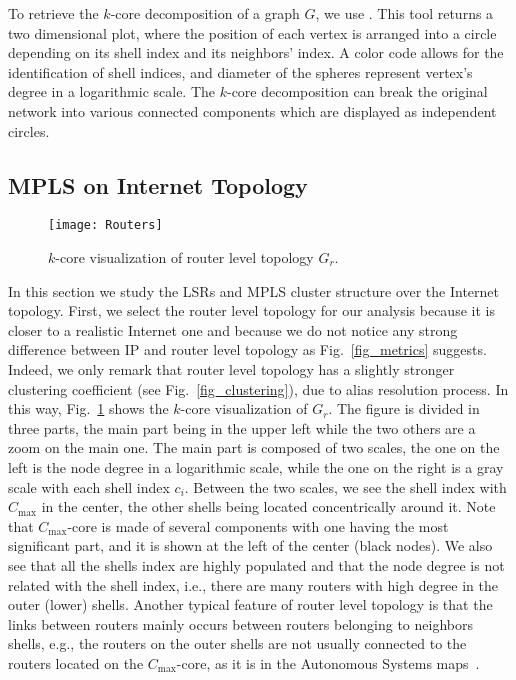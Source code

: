 To retrieve the $k$-core decomposition of a graph $G$, we use
\lanet\cite{Alvarez06k}. This tool returns a two dimensional plot, where the
position of each vertex is arranged into a circle depending on its shell index
and its neighbors' index. A color code allows for the identification of shell
indices, and diameter of the spheres represent vertex's degree in a logarithmic
scale. The $k$-core decomposition can break the original network into various
connected components which are displayed as independent circles.

\subsection{MPLS on Internet Topology}\label{cluster.topo}
\begin{figure}[!t]
  \begin{center}
    \texttt{[image: Routers]}
  \end{center}
\vspace{-0.5cm}
  \caption{$k$-core visualization of router level topology $G_{r}$.}
  \label{fig_k_core_routers}
\end{figure}

In this section we study the LSRs and MPLS cluster structure over the Internet
topology.  First, we select the router level topology for our analysis because
it is closer to a realistic Internet one and because we do not notice any strong
difference between IP and router level topology as Fig.~\ref{fig_metrics}
suggests. Indeed, we only remark that router level topology has a slightly
stronger clustering coefficient (see Fig.~\ref{fig_clustering}), due to alias
resolution process. In this way, Fig.~\ref{fig_k_core_routers} shows the
$k$-core visualization of $G_{r}$.  The figure is divided in three parts, the
main part being in the upper left while the two others are a zoom on the main
one.  The main part is composed of two scales, the one on the left is the node
degree in a logarithmic scale, while the one on the right is a gray scale with
each shell index $c_i$. Between the two scales, we see the shell index with
$C_{\max}$ in the center, the other shells being located concentrically around
it. Note that $C_{\max}$-core is made of several components with one having the
most significant part, and it is shown at the left of the center (black nodes).
We also see that all the shells index are highly populated and that the node
degree is not related with the shell index, i.e., there are many routers with
high degree in the outer (lower) shells. Another typical feature of router level
topology is that the links between routers mainly occurs between routers
belonging to neighbors shells, e.g., the routers on the outer shells are not
usually connected to the routers located on the  $C_{\max}$-core, as it is in
the Autonomous Systems maps~\cite{Alvarez06k}.

